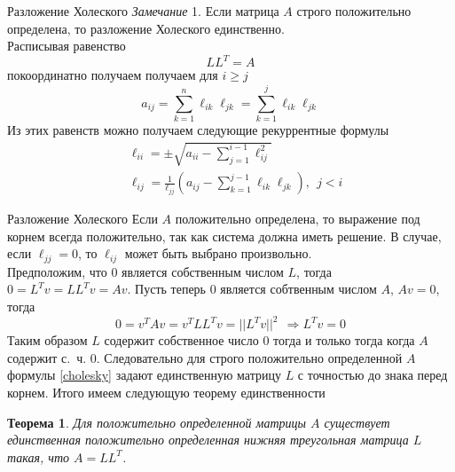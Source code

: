 \documentclass[10pt]{beamer}
\newcounter{thm}
\newtheorem{theorem_ru}[thm]{Теорема}
\begin{document}
\begin{frame}{Разложение Холеского}
\textit{Замечание} 1. Если матрица $A$ строго положительно определена, то разложение Холеского единственно.\\
\pause
Расписывая равенство 
$$
LL^T=A
$$
покоординатно получаем получаем для $i\geq j$
$$
a_{ij}=\sum_{k=1}^n\ell_{ik}\ell_{jk}=\sum_{k=1}^{j}\ell_{ik}\ell_{jk}
$$
\pause
Из этих равенств можно получаем следующие рекуррентные формулы 
\begin{align}\label{cholesky}
&\ell_{ii}=\pm\sqrt{a_{ii}-\sum_{j=1}^{i-1}\ell_{ij}^2}\nonumber\\
&\ell_{ij}=\frac{1}{\ell_{jj}}\left(a_{ij}-\sum_{k=1}^{j-1}\ell_{ik}\ell_{jk}\right),~~j<i
\end{align}

\end{frame}

\begin{frame}{Разложение Холеского}
Если $A$ положительно определена, то выражение под корнем всегда положительно, так как система должна иметь решение. В случае, если $\ell_{jj}=0$, то $\ell_{ij}$ может быть выбрано произвольно.\\
\pause
\vspace{1em}
Предположим, что $0$ является собственным числом $L$, тогда $0=L^Tv=LL^Tv=Av$. Пусть теперь $0$ является собтвенным числом $A$, $Av=0$, тогда 
$$
0=v^TAv=v^TLL^Tv=||L^Tv||^2~~\Rightarrow L^Tv=0
$$
\pause
Таким образом $L$ содержит собственное число $0$ тогда и только тогда когда $A$ содержит с.~ч. $0$. Следовательно для строго положительно определенной $A$ формулы \eqref{cholesky} задают единственную матрицу $L$ с точностью до знака перед корнем. Итого имеем следующую теорему единственности
\pause
\begin{theorem_ru}
Для положительно определенной матрицы $A$ существует единственная положительно определенная нижняя треугольная матрица $L$ такая, что $A=LL^T$.
\end{theorem_ru}
\end{frame}
\end{document}
